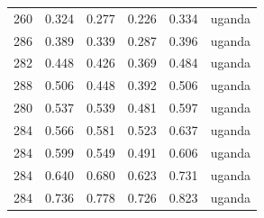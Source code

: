 \documentclass[10pt]{article}
\begin{document}
\begin{longtable}{rrrrrr}
260 & 0.324 & 0.277 & 0.226 & 0.334 & uganda \\
286 & 0.389 & 0.339 & 0.287 & 0.396 & uganda \\
282 & 0.448 & 0.426 & 0.369 & 0.484 & uganda \\
288 & 0.506 & 0.448 & 0.392 & 0.506 & uganda \\
280 & 0.537 & 0.539 & 0.481 & 0.597 & uganda \\
284 & 0.566 & 0.581 & 0.523 & 0.637 & uganda \\
284 & 0.599 & 0.549 & 0.491 & 0.606 & uganda \\
284 & 0.640 & 0.680 & 0.623 & 0.731 & uganda \\
284 & 0.736 & 0.778 & 0.726 & 0.823 & uganda \\
\bottomrule
\end{longtable}
\normalsize
\end{document}
